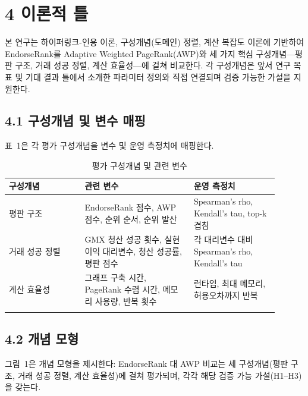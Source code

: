 \clearpage
{}
\section*{4 \textbf{이론적 틀}}
\label{sec:theoretical-framework}

본 연구는 하이퍼링크-인용 이론, 구성개념(도메인) 정렬, 계산 복잡도 이론에 기반하여 EndorseRank를 Adaptive Weighted PageRank(AWP)와 세 가지 핵심 구성개념---평판 구조, 거래 성공 정렬, 계산 효율성---에 걸쳐 비교한다. 각 구성개념은 앞서 연구 목표 및 기대 결과 틀에서 소개한 파라미터 정의와 직접 연결되며 검증 가능한 가설을 지원한다.


\subsection*{4.1 구성개념 및 변수 매핑}
\label{sec:constructs-and-variable-mapping}

표~1은 각 평가 구성개념을 변수 및 운영 측정치에 매핑한다.

\begin{longtable}{>{\raggedright\arraybackslash}p{0.25\linewidth}>{\raggedright\arraybackslash}p{0.36\linewidth}>{\raggedright\arraybackslash}p{0.29\linewidth}}
\caption{평가 구성개념 및 관련 변수}\\
\toprule
\textbf{구성개념} & \textbf{관련 변수} & \textbf{운영 측정치} \\
\midrule
평판 구조 & EndorseRank 점수, AWP 점수, 순위 순서, 순위 발산 & Spearman's rho, Kendall's tau, top-k 겹침 \\
\addlinespace
거래 성공 정렬 & GMX 청산 성공 횟수, 실현 이익 대리변수, 청산 성공률, 평판 점수 & 각 대리변수 대비 Spearman's rho, Kendall's tau \\
\addlinespace
계산 효율성 & 그래프 구축 시간, PageRank 수렴 시간, 메모리 사용량, 반복 횟수 & 런타임, 최대 메모리, 허용오차까지 반복 \\
\addlinespace
\bottomrule
\end{longtable}

\subsection*{4.2 개념 모형}
\label{sec:conceptual-model}

그림~1은 개념 모형을 제시한다: EndorseRank 대 AWP 비교는 세 구성개념(평판 구조, 거래 성공 정렬, 계산 효율성)에 걸쳐 평가되며, 각각 해당 검증 가능 가설(H1--H3)을 갖는다.


